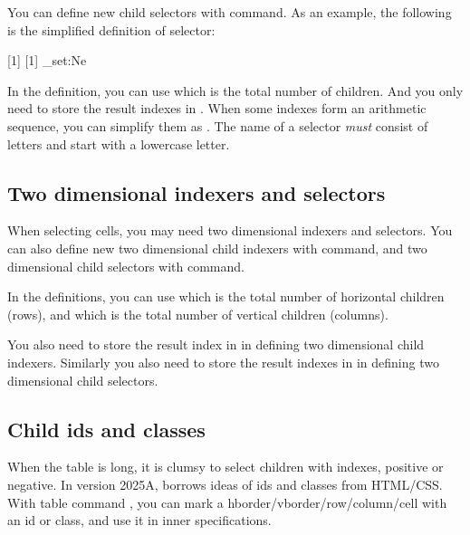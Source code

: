\documentclass[oneside]{book}
\renewcommand\emph[1]{\textit{\color{red3}#1}}
\begin{document}
{You can define new child selectors with \CC{\NewTblrChildSelector} command.
As an example, the following is the simplified definition of  selector:
\begin{codehigh}[language=latex/latex3]
\ExplSyntaxOn
{} [1] [1]
  {
    \clist_set:Ne 
  }
\ExplSyntaxOff
\end{codehigh}
In the definition, you can use \CC{\lTblrChildTotalInt} which is the total number of children.
And you only need to store the result indexes in \CC{\lTblrChildClist}.
When some indexes form an arithmetic sequence,
you can simplify them as .
The name of a selector \emph{must} consist of letters and start with a lowercase letter.

\subsection{Two dimensional indexers and selectors}

When selecting cells, you may need two dimensional indexers and selectors.
You can also define new two dimensional child indexers with \CC{\NewTblrChildIndexer} command,
and two dimensional child selectors with \CC{\NewTblrChildSelector} command.

In the definitions, you can use \CC{\lTblrChildHtotalInt}
which is the total number of horizontal children (rows), and \CC{\lTblrChildVtotalInt}
which is the total number of vertical children (columns).

You also need to store the result index  in \CC{\lTblrChildIndexTl}
in defining two dimensional child indexers.
Similarly you also need to store the result indexes in \CC{\lTblrChildClist}
in defining two dimensional child selectors.

\subsection{Child ids and classes}

When the table is long, it is clumsy to select children with indexes, positive or negative.
In version 2025A,  borrows ideas of ids and classes from HTML/CSS.
With table command \CC{\SetChild}, you can mark a hborder/vborder/row/column/cell with
an id or class, and use it in inner specifications.

}
\end{document}
